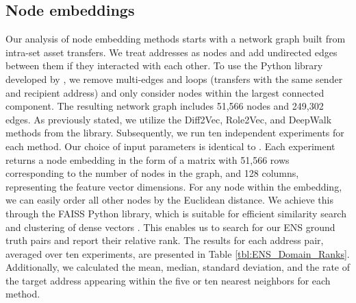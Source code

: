 \documentclass[12pt,a4paper,titlepage,oneside,english]{article}
\begin{document}
\subsection{Node embeddings}

Our analysis of node embedding methods starts with a network graph built from intra-set asset transfers. We treat addresses as nodes and add undirected edges between them if they interacted with each other. \newline
To use the Python library developed by \cite{karateclub}, we remove multi-edges and loops (transfers with the same sender and recipient address) and only consider nodes within the largest connected component. The resulting network graph includes 51,566 nodes and 249,302 edges. As previously stated, we utilize the Diff2Vec, Role2Vec, and DeepWalk methods from the library. \newline
Subsequently, we run ten independent experiments for each method. Our choice of input parameters is identical to \cite{Beres2020}. Each experiment returns a node embedding in the form of a matrix with 51,566 rows corresponding to the number of nodes in the graph, and 128 columns, representing the feature vector dimensions. \newline
For any node within the embedding, we can easily order all other nodes by the Euclidean distance. We achieve this through the FAISS Python library, which is suitable for efficient similarity search and clustering of dense vectors \citep{johnson2019faiss}.\newline 
This enables us to search for our ENS ground truth pairs and report their relative rank. The results for each address pair, averaged over ten experiments, are presented in Table \ref{tbl:ENS_Domain_Ranks}. Additionally, we calculated the mean, median, standard deviation, and the rate of the target address appearing within the five or ten nearest neighbors for each method.
\end{document}
